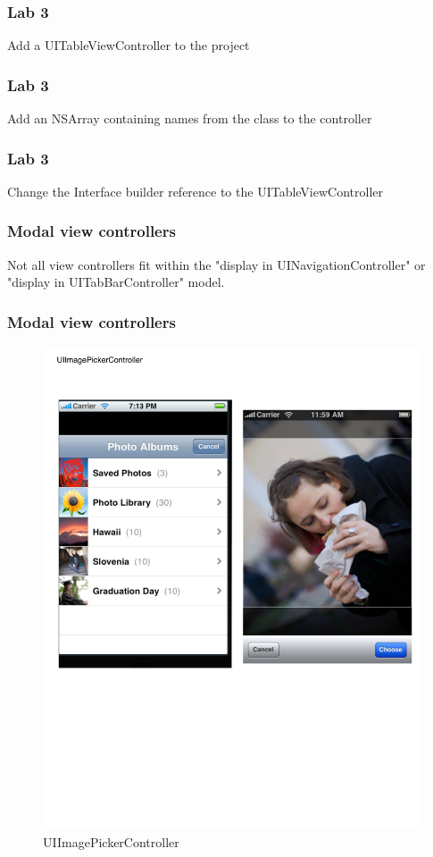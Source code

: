 \documentclass[10pt]{beamer}
\begin{document}
    
\begin{frame}[fragile]
  \frametitle{Lab 3}
  Add a UITableViewController to the project

\end{frame}

\begin{frame}[fragile]
  \frametitle{Lab 3}
  Add an NSArray containing names from the class to the controller

\end{frame}

\begin{frame}[fragile]
  \frametitle{Lab 3}
  Change the Interface builder reference to the UITableViewController

\end{frame}

    
\begin{frame}[fragile]
  \frametitle{Modal view controllers}
  Not all view controllers fit within the "display in UINavigationController" or "display in UITabBarController" model.

\end{frame}

\begin{frame}[fragile]
  \frametitle{Modal view controllers}
  \begin{figure}[htb]
  \begin{center}
  
  \includegraphics[scale=0.35]{UIViewExample6.pdf}
            
  \caption{UIImagePickerController}
  \end{center}
  \end{figure}

\end{frame}
\end{document}

